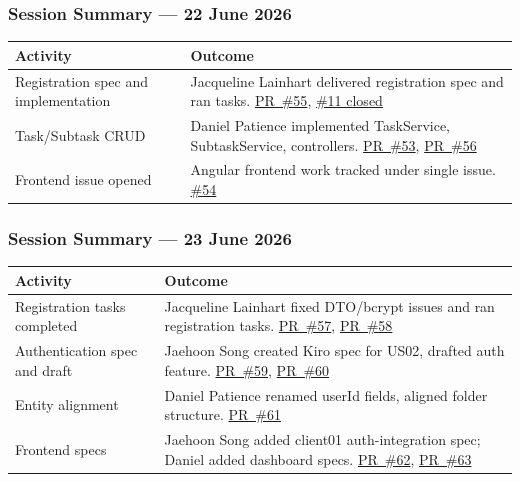 \subsubsection{Session Summary --- 22 June 2026}
\begin{tabularx}{\textwidth}{@{} l X @{}}
  \toprule
  \textbf{Activity} & \textbf{Outcome} \\
  \midrule
  Registration spec and implementation & Jacqueline Lainhart delivered registration spec and ran tasks.
    \href{https://github.com/JaehoonSong12/PEP-Team02-TheDJs/pull/55}{PR~\#55},
    \href{https://github.com/JaehoonSong12/PEP-Team02-TheDJs/issues/11}{\#11 closed} \\
  Task/Subtask CRUD & Daniel Patience implemented TaskService, SubtaskService, controllers.
    \href{https://github.com/JaehoonSong12/PEP-Team02-TheDJs/pull/53}{PR~\#53},
    \href{https://github.com/JaehoonSong12/PEP-Team02-TheDJs/pull/56}{PR~\#56} \\
  Frontend issue opened & Angular frontend work tracked under single issue.
    \href{https://github.com/JaehoonSong12/PEP-Team02-TheDJs/issues/54}{\#54} \\
  \bottomrule
\end{tabularx}

\subsubsection{Session Summary --- 23 June 2026}
\begin{tabularx}{\textwidth}{@{} l X @{}}
  \toprule
  \textbf{Activity} & \textbf{Outcome} \\
  \midrule
  Registration tasks completed & Jacqueline Lainhart fixed DTO/bcrypt issues and ran registration tasks.
    \href{https://github.com/JaehoonSong12/PEP-Team02-TheDJs/pull/57}{PR~\#57},
    \href{https://github.com/JaehoonSong12/PEP-Team02-TheDJs/pull/58}{PR~\#58} \\
  Authentication spec and draft & Jaehoon Song created Kiro spec for US02, drafted auth feature.
    \href{https://github.com/JaehoonSong12/PEP-Team02-TheDJs/pull/59}{PR~\#59},
    \href{https://github.com/JaehoonSong12/PEP-Team02-TheDJs/pull/60}{PR~\#60} \\
  Entity alignment & Daniel Patience renamed userId fields, aligned folder structure.
    \href{https://github.com/JaehoonSong12/PEP-Team02-TheDJs/pull/61}{PR~\#61} \\
  Frontend specs & Jaehoon Song added client01 auth-integration spec; Daniel added dashboard specs.
    \href{https://github.com/JaehoonSong12/PEP-Team02-TheDJs/pull/62}{PR~\#62},
    \href{https://github.com/JaehoonSong12/PEP-Team02-TheDJs/pull/63}{PR~\#63} \\
  \bottomrule
\end{tabularx}

